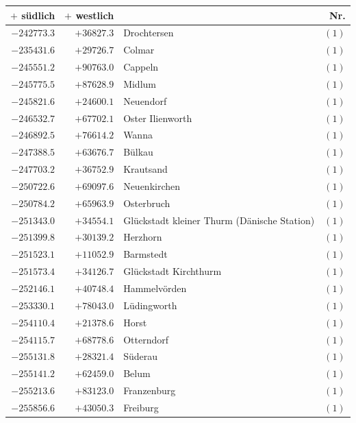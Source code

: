 \clearpage{}%
\begin{center}\begingroup\fontsize{8}{9}\selectfont
\setlength{\tabcolsep}{4pt}
\begin{tabular}{r|r|p{170pt}|r}\hline
\(+\) südlich&\(+\) westlich&&Nr.\\\hline
\(-242773.3\)&\(+36827.3\)&Drochtersen&\((1)\)\\
\(-235431.6\)&\(+29726.7\)&Colmar&\((1)\)\\
\(-245551.2\)&\(+90763.0\)&Cappeln&\((1)\)\\
\(-245775.5\)&\(+87628.9\)&Midlum&\((1)\)\\
\(-245821.6\)&\(+24600.1\)&Neuendorf&\((1)\)\\
\(-246532.7\)&\(+67702.1\)&Oster Ilienworth&\((1)\)\\
\(-246892.5\)&\(+76614.2\)&Wanna&\((1)\)\\
\(-247388.5\)&\(+63676.7\)&Bülkau&\((1)\)\\
\(-247703.2\)&\(+36752.9\)&Krautsand&\((1)\)\\
\(-250722.6\)&\(+69097.6\)&Neuenkirchen&\((1)\)\\
\(-250784.2\)&\(+65963.9\)&Osterbruch&\((1)\)\\
\(-251343.0\)&\(+34554.1\)&Glückstadt kleiner Thurm (Dänische Station)&\((1)\)\\
\(-251399.8\)&\(+30139.2\)&Herzhorn&\((1)\)\\
\(-251523.1\)&\(+11052.9\)&Barmstedt&\((1)\)\\
\(-251573.4\)&\(+34126.7\)&Glückstadt Kirchthurm&\((1)\)\\
\(-252146.1\)&\(+40748.4\)&Hammelvörden&\((1)\)\\
\(-253330.1\)&\(+78043.0\)&Lüdingworth&\((1)\)\\
\(-254110.4\)&\(+21378.6\)&Horst&\((1)\)\\
\(-254115.7\)&\(+68778.6\)&Otterndorf&\((1)\)\\
\(-255131.8\)&\(+28321.4\)&Süderau&\((1)\)\\
\(-255141.2\)&\(+62459.0\)&Belum&\((1)\)\\
\(-255213.6\)&\(+83123.0\)&Franzenburg&\((1)\)\\
\(-255856.6\)&\(+43050.3\)&Freiburg&\((1)\)\\
\hline\end{tabular}\endgroup\end{center}
\clearpage
